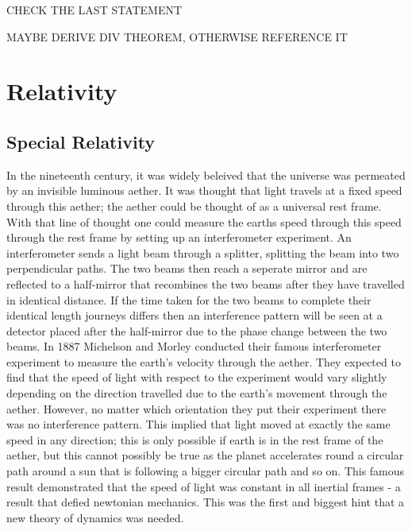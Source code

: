 CHECK THE LAST STATEMENT

MAYBE DERIVE DIV THEOREM, OTHERWISE REFERENCE IT



\section{Relativity}

\subsection{Special Relativity}

In the nineteenth century, it was widely beleived that the universe was permeated by an invisible luminous aether. It was thought that light travels at a fixed speed through this aether; the aether could be thought of as a universal rest frame. With that line of thought one could measure the earths speed through this speed through the rest frame by setting up an interferometer experiment. An interferometer sends a light beam through a splitter, splitting the beam into two perpendicular paths. The two beams then reach a seperate mirror and are reflected to a half-mirror that recombines the two beams after they have travelled in identical distance. If the time taken for the two beams to complete their identical length journeys differs then an interference pattern will be seen at a detector placed after the half-mirror due to the phase change between the two beams. In 1887 Michelson and Morley conducted their famous interferometer experiment to measure the earth's velocity through the aether. They expected to find that the speed of light with respect to the experiment would vary slightly depending on the direction travelled due to the earth's movement through the aether. However, no matter which orientation they put their experiment there was no interference pattern. This implied that light moved at exactly the same speed in any direction; this is only possible if earth is in the rest frame of the aether, but this cannot possibly be true as the planet accelerates round a circular path around a sun that is following a bigger circular path and so on. This famous result demonstrated that the speed of light was constant in all inertial frames - a result that defied newtonian mechanics. This was the first and biggest hint that a new theory of dynamics was needed. 

